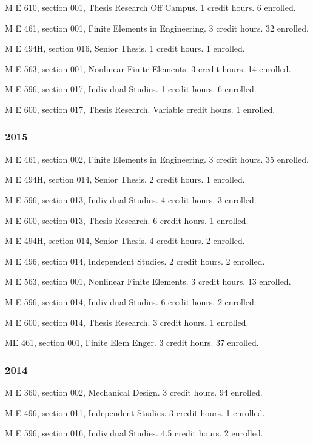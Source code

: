\documentclass[
]{article}
\begin{document}
M E 610, section 001, Thesis Research Off Campus. 1 credit hours. 6
enrolled.

M E 461, section 001, Finite Elements in Engineering. 3 credit hours. 32
enrolled.

M E 494H, section 016, Senior Thesis. 1 credit hours. 1 enrolled.

M E 563, section 001, Nonlinear Finite Elements. 3 credit hours. 14
enrolled.

M E 596, section 017, Individual Studies. 1 credit hours. 6 enrolled.

M E 600, section 017, Thesis Research. Variable credit hours. 1
enrolled.

\subsubsection{2015}\label{section-9}

M E 461, section 002, Finite Elements in Engineering. 3 credit hours. 35
enrolled.

M E 494H, section 014, Senior Thesis. 2 credit hours. 1 enrolled.

M E 596, section 013, Individual Studies. 4 credit hours. 3 enrolled.

M E 600, section 013, Thesis Research. 6 credit hours. 1 enrolled.

M E 494H, section 014, Senior Thesis. 4 credit hours. 2 enrolled.

M E 496, section 014, Independent Studies. 2 credit hours. 2 enrolled.

M E 563, section 001, Nonlinear Finite Elements. 3 credit hours. 13
enrolled.

M E 596, section 014, Individual Studies. 6 credit hours. 2 enrolled.

M E 600, section 014, Thesis Research. 3 credit hours. 1 enrolled.

ME 461, section 001, Finite Elem Enger. 3 credit hours. 37 enrolled.

\subsubsection{2014}\label{section-10}

M E 360, section 002, Mechanical Design. 3 credit hours. 94 enrolled.

M E 496, section 011, Independent Studies. 3 credit hours. 1 enrolled.

M E 596, section 016, Individual Studies. 4.5 credit hours. 2 enrolled.
\end{document}
